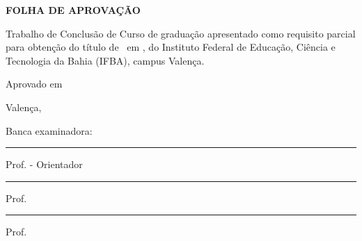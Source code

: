 \begin{center}
    \textbf{FOLHA DE APROVAÇÃO}\par%
    \vspace{1.5\baselineskip}
    \noindent\MakeUppercase{\studentName}\par
    \vspace{1.5\baselineskip}
    \Large
    \noindent\textbf{\MakeUppercase{\tccTitle}}\par
    \vspace{1\baselineskip}        
\end{center}

Trabalho de Conclusão de Curso de graduação apresentado como requisito parcial para obtenção do título de \grau\ em \course, do Instituto Federal de Educação, Ciência e Tecnologia da Bahia (IFBA), campus Valença. 

\vspace{2\baselineskip}
\hfill\noindent Aprovado em\par
\vspace{0.35\baselineskip}        
\hfill\noindent Valença, 
\vspace{3\baselineskip}

Banca examinadora:\par
%
\vspace{3\baselineskip}
\begin{center}
    \begin{minipage}[!h]{0.85\textwidth}
        \centering
        \rule{\textwidth}{0.4pt}\par
        \noindent Prof. \MakeUppercase{\advisor} - Orientador\par
        \noindent \instituteAdvisor
    \end{minipage}\par%
    \vspace{3.5\baselineskip}    
    \begin{minipage}[!h]{0.85\textwidth}
        \centering
        \rule{\textwidth}{0.4pt}\par
        \noindent Prof. \MakeUppercase{\membroBancaUm}\par
        \noindent \instituteMembroUm
    \end{minipage}\par%
    \vspace{3.5\baselineskip}    
    \begin{minipage}[!h]{0.85\textwidth}
        \centering
        \rule{\textwidth}{0.4pt}\par
        \noindent Prof. \MakeUppercase{\membroBancaDois}\par
        \noindent \instituteMembroDois
    \end{minipage}
\end{center}